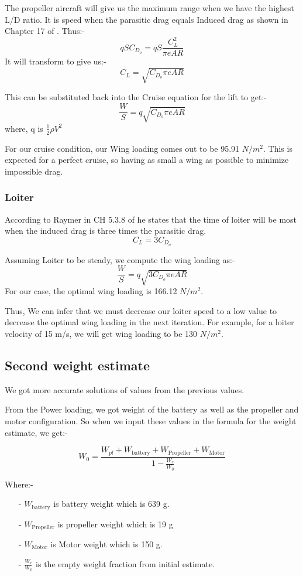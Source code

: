 \documentclass[12 pt]{article}
\begin{document}
The propeller aircraft will give us the maximum range when we have the highest L/D ratio. It is speed when the parasitic drag equals Induced drag as shown in Chapter 17 of \cite{Raymer. 2006}. Thus:-
$$qSC_{D_o} = qS\frac{C_L^2}{\pi e AR}$$
It will transform to give us:- 
$$ C_L = \sqrt{C_{D_o} \pi e AR }$$

This can be substituted back into the Cruise equation for the lift to get:-
$$ \frac{W}{S} = q \sqrt{C_{D_o} \pi e AR}$$
where, q is $\frac{1}{2} \rho V^2 $

For our cruise condition, our Wing loading comes out to be 95.91 $N/m^2$. This is expected for a perfect cruise, so having as small a wing as possible to minimize impossible drag.

\subsubsection{Loiter}

According to Raymer in CH 5.3.8 of \cite{Raymer. 2006} he states that the time of loiter will be most when the induced drag is three times the parasitic drag. 
$$C_L = 3 C_{D_o}$$

Assuming Loiter to be steady, we compute the wing loading as:-
$$\frac{W}{S} = q \sqrt{3C_{D_o} \pi e AR}$$
For our case, the optimal wing loading is 166.12 $N/m^2$.

Thus, We can infer that we must decrease our loiter speed to a low value to decrease the optimal wing loading in the next iteration. For example, for a loiter velocity of 15 m/s, we will get wing loading to be 130 $N/m^2$.

\subsection{Second weight estimate}

We got more accurate solutions of values from the previous values. 

From the Power loading, we got weight of the battery as well as the propeller and motor configuration. So when we input these values in the formula for the weight estimate, we get:- 

$$W_{0} = \frac{W_{pl}  +  W_{\text{battery}}+  W_{\text{Propeller}} + W_{\text{Motor}}}{1 - \frac{W_{e}}{W_{0}}}$$

Where:-
\begin{itemize}
    \item[-] $W_{\text{battery}}$ is battery weight which is 639 g.
    \item[-] $W_{\text{Propeller}}$ is propeller weight which is 19 g
    \item[-] $W_{\text{Motor}}$ is Motor weight which is 150 g.
    \item[-] $\frac{W_{e}}{W_{0}}$ is the empty weight fraction from initial estimate.
\end{itemize}
\end{document}
